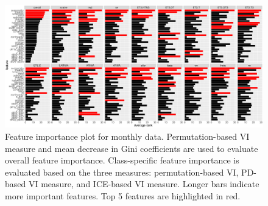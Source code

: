 \documentclass[11pt,a4paper,]{article}
\begin{document}
\begin{figure}[h]

{\centering \includegraphics{figures/vimonthly-1} 

}

\caption{Feature importance plot for monthly data. Permutation-based VI measure and mean decrease in Gini coefficients are used to evaluate overall feature importance. Class-specific feature importance is evaluated based on the three measures: permutation-based VI, PD-based VI measure, and ICE-based VI measure. Longer bars indicate more important features. Top 5 features are highlighted in red.}\label{fig:vimonthly}
\end{figure}

\newpage
\end{document}
